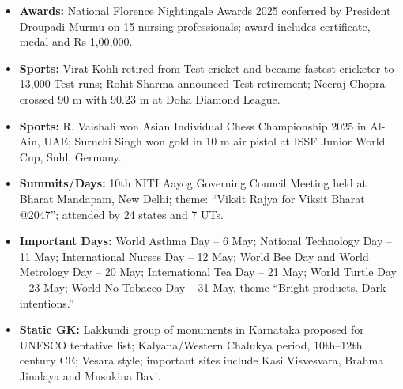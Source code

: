 \documentclass[10pt,a4paper]{article}
\begin{document}
\begin{itemize}
    \item \textbf{Awards:} National Florence Nightingale Awards 2025 conferred by President Droupadi Murmu on 15 nursing professionals; award includes certificate, medal and Rs 1,00,000.
    \item \textbf{Sports:} Virat Kohli retired from Test cricket and became fastest cricketer to 13,000 Test runs; Rohit Sharma announced Test retirement; Neeraj Chopra crossed 90 m with 90.23 m at Doha Diamond League.
    \item \textbf{Sports:} R. Vaishali won Asian Individual Chess Championship 2025 in Al-Ain, UAE; Suruchi Singh won gold in 10 m air pistol at ISSF Junior World Cup, Suhl, Germany.
    \item \textbf{Summits/Days:} 10th NITI Aayog Governing Council Meeting held at Bharat Mandapam, New Delhi; theme: ``Viksit Rajya for Viksit Bharat @2047''; attended by 24 states and 7 UTs.
    \item \textbf{Important Days:} World Asthma Day -- 6 May; National Technology Day -- 11 May; International Nurses Day -- 12 May; World Bee Day and World Metrology Day -- 20 May; International Tea Day -- 21 May; World Turtle Day -- 23 May; World No Tobacco Day -- 31 May, theme ``Bright products. Dark intentions.''
    \item \textbf{Static GK:} Lakkundi group of monuments in Karnataka proposed for UNESCO tentative list; Kalyana/Western Chalukya period, 10th--12th century CE; Vesara style; important sites include Kasi Visvesvara, Brahma Jinalaya and Musukina Bavi.
\end{itemize}
\end{document}
